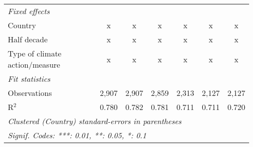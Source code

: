 \begin{tabular}{lcccccc}
   \emph{Fixed effects}\\
   Country                                             & x       & x       & x       & x            & x             & x\\  
   Half decade                                         & x       & x       & x       & x            & x             & x\\  
   Type of climate action/measure                      & x       & x       & x       & x            & x             & x\\  
   \midrule \emph{Fit statistics}\\
   Observations                                        & 2,907   & 2,907   & 2,859   & 2,313        & 2,127         & 2,127\\  
   R$^2$                                               & 0.780   & 0.782   & 0.781   & 0.711        & 0.711         & 0.720\\  
   \midrule
   \multicolumn{7}{l}{\emph{Clustered (Country) standard-errors in parentheses}}\\
   \multicolumn{7}{l}{\emph{Signif. Codes: ***: 0.01, **: 0.05, *: 0.1}}\\
\end{tabular}
\par\endgroup


